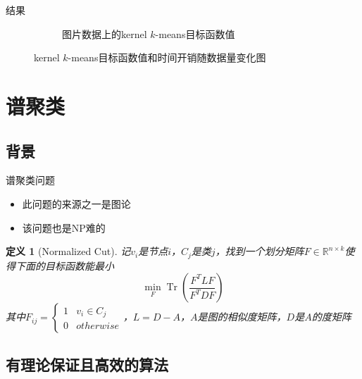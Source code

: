 \documentclass[notheorems]{beamer}
\newcommand{\R}{\mathbb{R}}
\newtheorem{definition}{定义}
\begin{document}
\begin{CJK*}{UTF8}{gbsn}
\begin{frame}{结果}
{\begin{minipage}{1.0\linewidth}
\begin{figure}[H]
\begin{subfigure}{0.6\columnwidth}
					\caption{图片数据上的kernel $k$-means目标函数值}
				\end{subfigure}
				\caption{kernel $k$-means目标函数值和时间开销随数据量变化图}
				\label{fig: image running time & ncut}
			\end{figure}
		\end{minipage}
	}
	
\end{frame}

\section{谱聚类}

\subsection{背景}

\begin{frame}{谱聚类问题}
	\begin{itemize}
		\item 此问题的来源之一是图论
		\item 该问题也是NP难的
	\end{itemize}
	\begin{definition}[Normalized Cut]
		记$v_i$是节点$i$，$C_j$是类$j$，找到一个划分矩阵$F \in \R^{n\times k}$使得下面的目标函数能最小
		\begin{equation}
			\min\limits_{F} \operatorname{Tr}(\frac{F^T L F}{F^T D F})
		\end{equation}
		其中$F_{ij} = \begin{cases} 1 & {v_i \in C_j} \\ 0 & {otherwise}
		\end{cases}$，$L = D-A$，$A$是图的相似度矩阵，$D$是$A$的度矩阵
	\end{definition}
\end{frame}

\subsection{有理论保证且高效的算法}


\end{CJK*}
\end{document}
